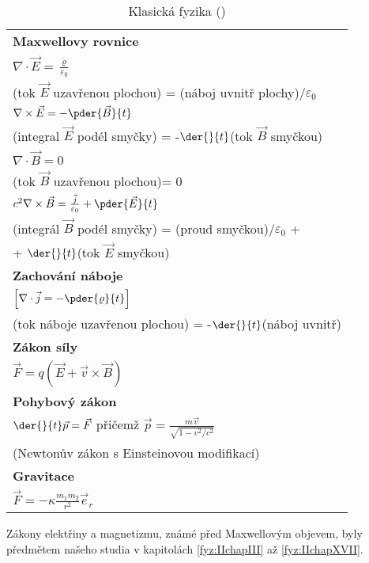   \begin{table}[ht!]      %
    \centering
    \begin{tabular}{l}
       \hline 
       \textbf{Maxwellovy rovnice}              \\
       \(\nabla\cdot\vec{E} = \frac{\varrho}{\varepsilon_0}\) \\
       (tok \(\vec{E}\) uzavřenou plochou) = (náboj uvnitř plochy)/\(\varepsilon_0\)  \\
       \(\nabla\times\vec{E} = -\pder{\vec{B}}{t}\)    \\
       (integral \(\vec{E}\) podél smyčky) = -\(\der{ }{t}\)(tok \(\vec{B}\) smyčkou) \\
       \(\nabla\cdot\vec{B} = 0\)                    \\
       (tok \(\vec{B}\) uzavřenou plochou)= 0        \\
       \(c^2\nabla\times\vec{B} = \frac{\vec{j}}{\varepsilon_0} + \pder{\vec{E}}{t}\) \\
       (integrál \(\vec{B}\) podél smyčky) =  (proud smyčkou)/\(\varepsilon_0\) +  \\
        + \(\der{}{t}\)(tok \(\vec{E}\) smyčkou)       \\
       \hline 
       \textbf{Zachování náboje}  \\
       \(\left[\nabla\cdot\vec{j} = -\pder{\varrho}{t}\right]\)  \\
       (tok náboje uzavřenou plochou) = -\(\der{ }{t}\)(náboj uvnitř) \\
       \hline
       \textbf{Zákon síly}  \\
       \(\vec{F} = q(\vec{E} + \vec{v}\times\vec{B})\)       \\
       \hline
       \textbf{Pohybový zákon}  \\
       \(\der{}{t}\vec{p} = \vec{F}\)  
       přičemž \(\vec{p} = \frac{m\vec{v}}{\sqrt{1-v^2/c^2}}\)   \\
       (Newtonův zákon s Einsteinovou modifikací)                 \\
       \hline
       \textbf{Gravitace}               \\
       \(\vec{F} = -\kappa\frac{m_1m_2}{r^2}\vec{e}_r\)    \\
       \hline
    \end{tabular}
    \caption{Klasická fyzika (\cite[s.~318]{Feynman02})}
    \label{fyz:tab010}
  \end{table}
    
  Zákony elektřiny a magnetizmu, známé před Maxwellovým objevem, byly předmětem našeho studia v 
  kapitolách \ref{fyz:IIchapIII} až \ref{fyz:IIchapXVII}. 
  
